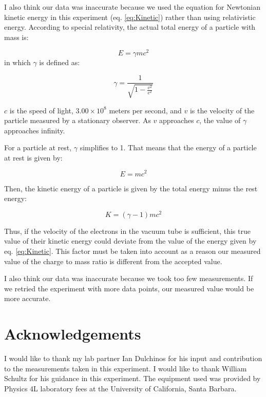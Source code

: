 \documentclass[journal, a4paper]{IEEEtran}
\begin{document}
    I also think our data was inaccurate because we used the equation for Newtonian kinetic energy in this experiment (eq. \ref{eq:Kinetic}) rather than using relativistic energy. According to special relativity, the actual total energy of a particle with mass is:
    
    \begin{equation} \label{eq:KRelativity} %
E=\gamma mc^2
\end{equation}
in which $\gamma$ is defined as:

	\begin{equation} \label{eq:gamma} %
\gamma = \frac{1}{\sqrt{1-\frac{v^2}{c^2}}}
\end{equation}

	$c$ is the speed of light, $3.00 \times 10^8$ meters per second, and $v$ is the velocity of the particle measured by a stationary observer. As $v$ approaches $c$, the value of $\gamma$ approaches infinity. 
    
    For a particle at rest, $\gamma$ simplifies to 1. That means that the energy of a particle at rest is given by:
    
    \begin{equation} \label{eq:restenergy} %
E=mc^2
\end{equation}

	Then, the kinetic energy of a particle is given by the total energy minus the rest energy:
    
    \begin{equation} \label{eq:realtivekinetic} %
K=(\gamma-1)mc^2
\end{equation}
    
    Thus, if the velocity of the electrons in the vacuum tube is sufficient, this true value of their kinetic energy could deviate from the value of the energy given by eq. \ref{eq:Kinetic}. This factor must be taken into account as a reason our measured value of the charge to mass ratio is different from the accepted value. 
    
    I also think our data was inaccurate because we took too few measurements. If we retried the experiment with more data points, our measured value would be more accurate.
    
\section{Acknowledgements}
	I would like to thank my lab partner Ian Dulchinos for his input and contribution to the measurements taken in this experiment. I would like to thank William Schultz for his guidance in this experiment. The equipment used was provided by Physics 4L laboratory fees at the University of California, Santa Barbara.
\end{document}
